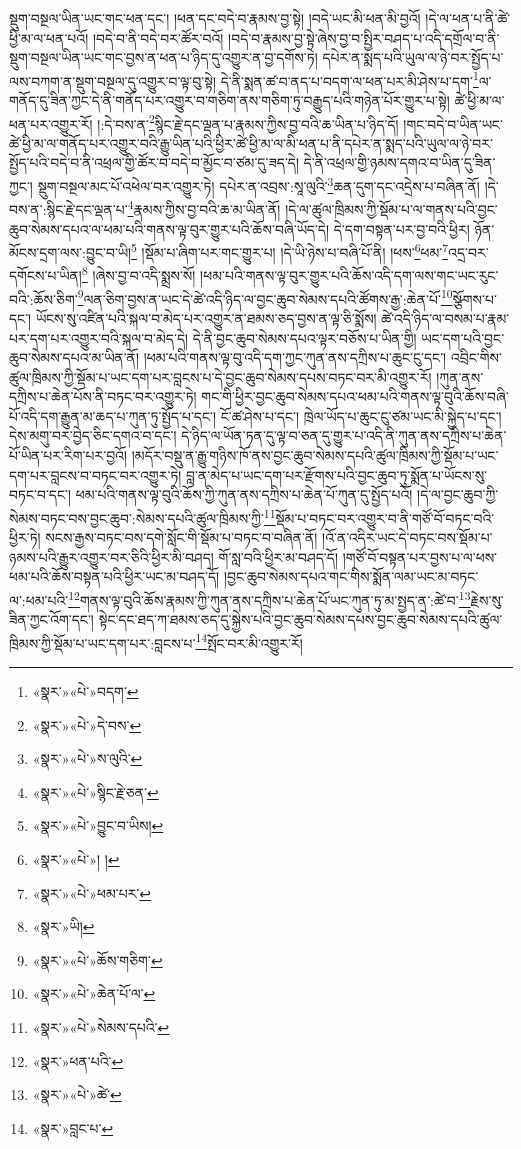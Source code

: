 སྡུག་བསྔལ་ཡིན་ཡང་གང་ཕན་དང་། །ཕན་དང་བདེ་བ་རྣམས་བྱ་སྟེ། །བདེ་ཡང་མི་ཕན་མི་བྱའོ། །དེ་ལ་ཕན་པ་ནི་ཚེ་ཕྱི་མ་ལ་ཕན་པའོ། །བདེ་བ་ནི་བདེ་བར་ཚོར་བའོ། །བདེ་བ་རྣམས་བྱ་སྟེ་ཞེས་བྱ་བ་སྤྱིར་བཤད་པ་འདི་དགྲོལ་བ་ནི་སྡུག་བསྔལ་ཡིན་ཡང་གང་བྱས་ན་ཕན་པ་ཉིད་དུ་འགྱུར་ན་བྱ་དགོས་ཏེ། དཔེར་ན་སྨད་པའི་ཡུལ་ལ་ཉེ་བར་སྤྱོད་པ་ལས་བཀག་ན་སྡུག་བསྔལ་དུ་འགྱུར་བ་ལྟ་བུ་སྟེ། དེ་ནི་སྨན་ཚ་བ་ནད་པ་བདག་ལ་ཕན་པར་མི་ཤེས་པ་དག་\footnote{«སྣར་»«པེ་»བདག་}ལ་གནོད་དུ་ཟིན་ཀྱང་དེ་ནི་གནོད་པར་འགྱུར་བ་གཅིག་ནས་གཅིག་ཏུ་བརྒྱུད་པའི་གཉེན་པོར་གྱུར་པ་སྟེ། ཚེ་ཕྱི་མ་ལ་ཕན་པར་འགྱུར་རོ། །:དེ་བས་ན་\footnote{«སྣར་»«པེ་»དེ་བས་}སྙིང་རྗེ་དང་ལྡན་པ་རྣམས་ཀྱིས་བྱ་བའི་ཆ་ཡིན་པ་ཉིད་དོ། །གང་བདེ་བ་ཡིན་ཡང་ཚེ་ཕྱི་མ་ལ་གནོད་པར་འགྱུར་བའི་རྒྱུ་ཡིན་པའི་ཕྱིར་ཚེ་ཕྱི་མ་ལ་མི་ཕན་པ་ནི་དཔེར་ན་སྨད་པའི་ཡུལ་ལ་ཉེ་བར་སྤྱོད་པའི་བདེ་བ་ནི་འཕྲལ་གྱི་ཚོར་བ་བདེ་བ་མྱོང་བ་ཙམ་དུ་ཟད་དེ། དེ་ནི་འཕྲལ་གྱི་ཉམས་དགའ་བ་ཡིན་དུ་ཟིན་ཀྱང་། སྡུག་བསྔལ་མང་པོ་འཕེལ་བར་འགྱུར་ཏེ། དཔེར་ན་འབྲས་:སཱ་ལུའི་\footnote{«སྣར་»«པེ་»ས་ལུའི་}ཆན་དུག་དང་འདྲེས་པ་བཞིན་ནོ། །དེ་བས་ན་:སྙིང་རྗེ་དང་ལྡན་པ་\footnote{«སྣར་»«པེ་»སྙིང་རྗེ་ཅན་}རྣམས་ཀྱིས་བྱ་བའི་ཆ་མ་ཡིན་ནོ། །དེ་ལ་ཚུལ་ཁྲིམས་ཀྱི་སྡོམ་པ་ལ་གནས་པའི་བྱང་ཆུབ་སེམས་དཔའ་ལ་ཕམ་པའི་གནས་ལྟ་བུར་གྱུར་པའི་ཆོས་བཞི་ཡོད་དེ། དེ་དག་བསྟན་པར་བྱ་བའི་ཕྱིར། ཉོན་མོངས་དྲག་ལས་:བྱུང་བ་ཡི།\footnote{«སྣར་»«པེ་»བྱུང་བ་ཡིས།} །སྡོམ་པ་ཞིག་པར་གང་གྱུར་པ། །དེ་ཡི་ཉེས་པ་བཞི་པོ་ནི། །ཕས་\footnote{«སྣར་»«པེ་»། །}ཕམ་\footnote{«སྣར་»«པེ་»ཕམ་པར་}འདྲ་བར་དགོངས་པ་ཡིན།\footnote{«སྣར་»ཡི།} །ཞེས་བྱ་བ་འདི་སྨྲས་སོ། །ཕམ་པའི་གནས་ལྟ་བུར་གྱུར་པའི་ཆོས་འདི་དག་ལས་གང་ཡང་རུང་བའི་:ཆོས་ཅིག་\footnote{«སྣར་»«པེ་»ཆོས་གཅིག་}ལན་ཅིག་བྱས་ན་ཡང་དེ་ཚེ་འདི་ཉིད་ལ་བྱང་ཆུབ་སེམས་དཔའི་ཚོགས་རྒྱ་:ཆེན་པོ་\footnote{«སྣར་»«པེ་»ཆེན་པོ་ལ་}སྩོགས་པ་དང་། ཡོངས་སུ་འཛིན་པའི་སྐལ་བ་མེད་པར་འགྱུར་ན་ཐམས་ཅད་བྱས་ན་ལྟ་ཅི་སྨོས། ཚེ་འདི་ཉིད་ལ་བསམ་པ་རྣམ་པར་དག་པར་འགྱུར་བའི་སྐལ་བ་མེད་དེ། དེ་ནི་བྱང་ཆུབ་སེམས་དཔའ་ལྟར་བཅོས་པ་ཡིན་གྱི། ཡང་དག་པའི་བྱང་ཆུབ་སེམས་དཔའ་མ་ཡིན་ནོ། །ཕམ་པའི་གནས་ལྟ་བུ་འདི་དག་ཀྱང་ཀུན་ནས་དཀྲིས་པ་ཆུང་ངུ་དང་། འབྲིང་གིས་ཚུལ་ཁྲིམས་ཀྱི་སྡོམ་པ་ཡང་དག་པར་བླངས་པ་དེ་བྱང་ཆུབ་སེམས་དཔས་བཏང་བར་མི་འགྱུར་རོ། །ཀུན་ནས་དཀྲིས་པ་ཆེན་པོས་ནི་བཏང་བར་འགྱུར་ཏེ། གང་གི་ཕྱིར་བྱང་ཆུབ་སེམས་དཔའ་ཕམ་པའི་གནས་ལྟ་བུའི་ཆོས་བཞི་པོ་འདི་དག་རྒྱུན་མ་ཆད་པ་ཀུན་ཏུ་སྤྱོད་པ་དང་། ངོ་ཚ་ཤེས་པ་དང་། ཁྲེལ་ཡོད་པ་ཆུང་ངུ་ཙམ་ཡང་མི་སྐྱེད་པ་དང་། དེས་མགུ་བར་བྱེད་ཅིང་དགའ་བ་དང་། དེ་ཉིད་ལ་ཡོན་ཏན་དུ་ལྟ་བ་ཅན་དུ་གྱུར་པ་འདི་ནི་ཀུན་ནས་དཀྲིས་པ་ཆེན་པོ་ཡིན་པར་རིག་པར་བྱའོ། །མདོར་བསྡུ་ན་རྒྱུ་གཉིས་ཁོ་ནས་བྱང་ཆུབ་སེམས་དཔའི་ཚུལ་ཁྲིམས་ཀྱི་སྡོམ་པ་ཡང་དག་པར་བླངས་བ་བཏང་བར་འགྱུར་ཏེ། བླ་ན་མེད་པ་ཡང་དག་པར་རྫོགས་པའི་བྱང་ཆུབ་ཏུ་སྨོན་པ་ཡོངས་སུ་བཏང་བ་དང་། ཕམ་པའི་གནས་ལྟ་བུའི་ཆོས་ཀྱི་ཀུན་ནས་དཀྲིས་པ་ཆེན་པོ་ཀུན་དུ་སྤྱོད་པའོ། །དེ་ལ་བྱང་ཆུབ་ཀྱི་སེམས་བཏང་བས་བྱང་ཆུབ་:སེམས་དཔའི་ཚུལ་ཁྲིམས་ཀྱི་\footnote{«སྣར་»«པེ་»སེམས་དཔའི་}སྡོམ་པ་བཏང་བར་འགྱུར་བ་ནི་གཙོ་བོ་བཏང་བའི་ཕྱིར་ཏེ། སངས་རྒྱས་བཏང་བས་དགེ་སློང་གི་སྡོམ་པ་བཏང་བ་བཞིན་ནོ། །འོ་ན་འདིར་ཡང་དེ་བཏང་བས་སྡོམ་པ་ཉམས་པའི་རྒྱུར་འགྱུར་བར་ཅིའི་ཕྱིར་མི་བཤད། གོ་སླ་བའི་ཕྱིར་མ་བཤད་དོ། །གཙོ་བོ་བསྟན་པར་བྱས་པ་ལ་ཕས་ཕམ་པའི་ཆོས་བསྟན་པའི་ཕྱིར་ཡང་མ་བཤད་དོ། །བྱང་ཆུབ་སེམས་དཔའ་གང་གིས་སྨོན་ལམ་ཡང་མ་བཏང་ལ་:ཕམ་པའི་\footnote{«སྣར་»ཕན་པའི་}གནས་ལྟ་བུའི་ཆོས་རྣམས་ཀྱི་ཀུན་ནས་དཀྲིས་པ་ཆེན་པོ་ཡང་ཀུན་ཏུ་མ་སྤྱད་ན་:ཚེ་བ་\footnote{«སྣར་»«པེ་»ཚེ་}རྗེས་སུ་ཟིན་ཀྱང་འོག་དང་། སྟེང་དང་ཐད་ཀ་ཐམས་ཅད་དུ་སྐྱེས་པའི་བྱང་ཆུབ་སེམས་དཔས་བྱང་ཆུབ་སེམས་དཔའི་ཚུལ་ཁྲིམས་ཀྱི་སྡོམ་པ་ཡང་དག་པར་:བླངས་པ་\footnote{«སྣར་»བླང་པ་}སྤོང་བར་མི་འགྱུར་རོ། 